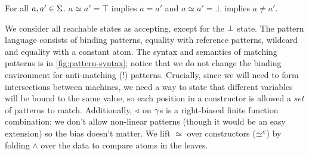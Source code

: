 \begin{property}
  For all $a, a' \in \Sigma$. $a \simeq a' = \top$ implies $a = a'$ and $a \simeq a' = \bot$ implies $a \neq a'$.
\end{property}
%
We consider all reachable states as accepting, except for the $\bot$ state.
%
The pattern language consists of binding patterns, equality with reference patterns, wildcard and equality with a constant atom.
%
The syntax and semantics of matching patterns is in \autoref{fig:pattern-syntax}; notice that we do not change the binding environment for anti-matching ($!$) patterns.
%
Crucially, since we will need to form intersections between machines, we need a way to state that different variables will be bound to the same value, so each position in a constructor is allowed a \emph{set} of patterns to match.
%
Additionally, $\triangleleft$ on $\gamma$s is a right-biased finite function combination; we don't allow non-linear patterns (though it would be an easy extension) so the bias doesn't matter.
%
We lift $\simeq$ over constructors ($\simeq^c$) by folding $\wedge$ over the data to compare atoms in the leaves.
%
